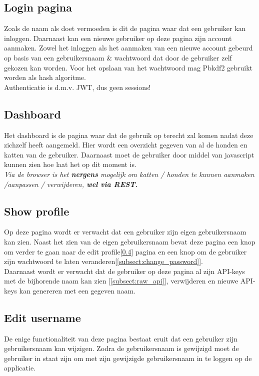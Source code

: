 \documentclass{article}
\begin{document}
\subsection{Login pagina} 
\label{subsect:login_pagina}
Zoals de naam als doet vermoeden is dit de pagina waar dat een gebruiker kan inloggen. Daarnaast kan een nieuwe gebruiker op deze pagina zijn account aanmaken. Zowel het inloggen als het aanmaken van een nieuwe account gebeurd op basis van een gebruikersnaam \& wachtwoord dat door de gebruiker zelf gekozen kan worden. Voor het opslaan van het wachtwoord mag Pbkdf2 gebruikt worden als hash algoritme. \\

Authenticatie is d.m.v. JWT, dus geen sessions!

\subsection{Dashboard} 
\label{subsect:home_page}
Het dashboard is de pagina waar dat de gebruik op terecht zal komen nadat deze zichzelf heeft aangemeld. Hier wordt een overzicht gegeven van al de honden en katten van de gebruiker. Daarnaast moet de gebruiker door middel van javascript kunnen zien hoe laat het op dit moment is. \\

\textit{Via de browser is het \textbf{nergens} mogelijk om katten / honden te kunnen aanmaken /aanpassen / verwijderen, \textbf{wel via REST.}}

\subsection{Show profile}
\label{subsect:show_profile}
Op deze pagina wordt er verwacht dat een gebruiker zijn eigen gebruikersnaam kan zien. Naast het zien van de eigen gebruikersnaam bevat deze pagina een knop om verder te gaan naar de edit profile[\ref{subsect:Edit_profile}] pagina en een knop om de gebruiker zijn wachtwoord te laten veranderen[\ref{subsect:change_password}]. \\

Daarnaast wordt er verwacht dat de gebruiker op deze pagina al zijn API-keys met de bijhorende naam kan zien [\ref{subsect:raw_api}], verwijderen en nieuwe API-keys kan genereren met een gegeven naam.

\subsection{Edit username}
\label{subsect:Edit_profile}
De enige functionaliteit van deze pagina bestaat eruit dat een gebruiker zijn gebruikersnaam kan wijzigen. Zodra de gebruikersnaam is gewijzigd moet de gebruiker in staat zijn om met zijn gewijzigde gebruikersnaam in te loggen op de applicatie.
\end{document}
